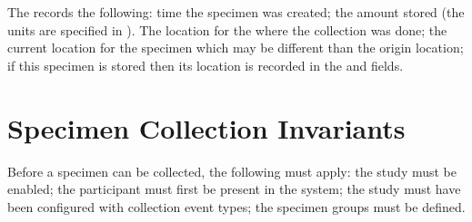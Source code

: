 The  records the following: time the specimen was created;
the amount stored (the units are specified in ). The
location for the  where the collection was done; the current
location for the specimen which may be different than the origin location; if
this specimen is stored then its location is recorded in the
 and  fields.

\section{Specimen Collection Invariants}
Before a specimen can be collected, the following must apply: the study must be
enabled; the participant must first be present in the system; the study must
have been configured with collection event types; the specimen groups must be
defined.


